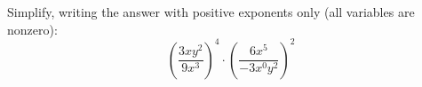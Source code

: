 Simplify, writing the answer with positive exponents only (all variables are nonzero):
\[
\left(\dfrac{3xy^2}{9x^3}\right)^4\cdot\left(\dfrac{6x^5}{-3x^0y^2}\right)^2
\]
